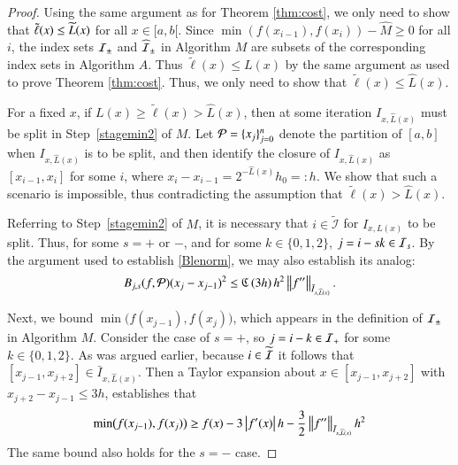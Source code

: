 \documentclass[review]{elsarticle}
\theoremstyle{definition}
\newcommand{\tell}{\tilde{\ell}}
\newcommand{\chL}{\widehat{L}}
\newcommand{\minfii}{\min(f(x_{i-1}), f(x_i))} %
\begin{document}
\begin{proof}
	Using the same argument as for Theorem \ref{thm:cost}, we only need to show that $\tell(x) \le \tL(x)$ for all $x \in [a,b[$.  Since $\minfii - \widehat{M} \ge 0$ for all $i$, the index sets $\mathcal{I}_{\pm}$ and $\widehat{\mathcal{I}}_{\pm}$ in Algorithm $M$ are subsets of the corresponding index sets in Algorithm $A$.  Thus $\tell(x) \le L(x)$ by the same argument as used to prove Theorem \ref{thm:cost}.  Thus, we only need to show that $\tell(x) \le \chL(x)$.
	
	For a fixed $x$, if $L(x) \ge \tell(x) > \chL(x)$, then at some iteration $I_{x,\chL(x)}$ must be split in Step~\ref{stagemin2} of $M$.  Let $\mathcal{P} = \{x_j\}_{j=0}^n$ denote the partition of $[a,b]$ when $I_{x,\chL(x)}$ is to be split, and then identify the closure of $I_{x,\chL(x)}$ as $[x_{i-1},x_i]$ for some $i$, where $x_i-x_{i-1}=2^{-\chL(x)}h_0 =: h$. We show that such a scenario is impossible, thus contradicting the assumption that $\tell(x) > \chL(x)$.


Referring to Step~\ref{stagemin2} of $M$, it is necessary that $i \in \widetilde{\mathcal{I}}$ for $I_{x,L(x)}$ to be split.  Thus, for some $s =+$ or $-$, and for some $k \in \{0,1,2\}$, $j = i  - sk \in \mathcal{I}_s$.   By the argument used to establish \eqref{Blenorm}, we may also establish its analog:
\begin{equation} \label{Blenormt}
B_{j,s}(f,\cp)(x_j-x_{j-1})^2 \le  \fC\left(3h\right) h^2  \norm[\bar{I}_{x,\chL(x)}]{f''}.
\end{equation}

Next, we bound $\min\bigl(f(x_{j-1}),f(x_j) \bigr)$, which appears in the definition of $\mathcal{I}_{\pm}$ in Algorithm $M$.  Consider the case of $s=+$, so $j = i  - k \in \mathcal{I}_+$ for some $k \in \{0,1,2\}$.  As was argued earlier, because $i \in \widetilde{\mathcal{I}}$ it follows that $[x_{j-1},x_{j+2}] \in \bar{I}_{x,\chL(x)}$.  Then a Taylor expansion about $x \in [x_{j-1},x_{j+2}]$ with $x_{j+2} - x_{j-1} \le 3h$, establishes that
\begin{equation} \label{minfjjm1bd}
\min\bigl(f(x_{j-1}),f(x_j) \bigr)
\ge f(x) - 3\abs{f'(x)}h - \frac32  \norm[\bar{I}_{x,\chL(x)}]{f''} h^2
\end{equation}
The same bound also holds for the $s = -$ case.


\end{proof}
\end{document}
